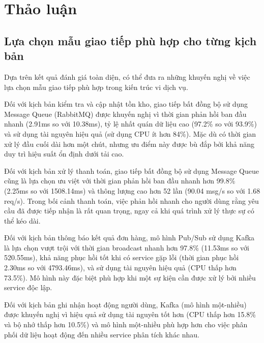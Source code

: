 \section{Thảo luận}

\subsection{Lựa chọn mẫu giao tiếp phù hợp cho từng kịch bản}
Dựa trên kết quả đánh giá toàn diện, có thể đưa ra những khuyến nghị về việc lựa chọn mẫu giao tiếp phù hợp trong kiến trúc vi dịch vụ.

Đối với kịch bản kiểm tra và cập nhật tồn kho, giao tiếp bất đồng bộ sử dụng Message Queue (RabbitMQ) được khuyến nghị vì thời gian phản hồi ban đầu nhanh (2.91ms so với 10.38ms), tỷ lệ nhất quán dữ liệu cao (97.2\% so với 93.9\%) và sử dụng tài nguyên hiệu quả (sử dụng CPU ít hơn 84\%). Mặc dù có thời gian xử lý đầu cuối dài hơn một chút, nhưng ưu điểm này được bù đắp bởi khả năng duy trì hiệu suất ổn định dưới tải cao.

Đối với kịch bản xử lý thanh toán, giao tiếp bất đồng bộ sử dụng Message Queue cũng là lựa chọn ưu việt với thời gian phản hồi ban đầu nhanh hơn 99.8\% (2.25ms so với 1508.14ms) và thông lượng cao hơn 52 lần (90.04 msg/s so với 1.68 req/s). Trong bối cảnh thanh toán, việc phản hồi nhanh cho người dùng rằng yêu cầu đã được tiếp nhận là rất quan trọng, ngay cả khi quá trình xử lý thực sự có thể kéo dài.

Đối với kịch bản thông báo kết quả đơn hàng, mô hình Pub/Sub sử dụng Kafka là lựa chọn vượt trội với thời gian broadcast nhanh hơn 97.8\% (11.53ms so với 520.55ms), khả năng phục hồi tốt khi có service gặp lỗi (thời gian phục hồi 2.30ms so với 4793.46ms), và sử dụng tài nguyên hiệu quả (CPU thấp hơn 73.5\%). Mô hình này đặc biệt phù hợp khi một sự kiện cần được xử lý bởi nhiều service độc lập.

Đối với kịch bản ghi nhận hoạt động người dùng, Kafka (mô hình một-nhiều) được khuyến nghị vì hiệu quả sử dụng tài nguyên tốt hơn (CPU thấp hơn 15.8\% và bộ nhớ thấp hơn 10.5\%) và mô hình một-nhiều phù hợp hơn cho việc phân phối dữ liệu hoạt động đến nhiều service phân tích khác nhau.

